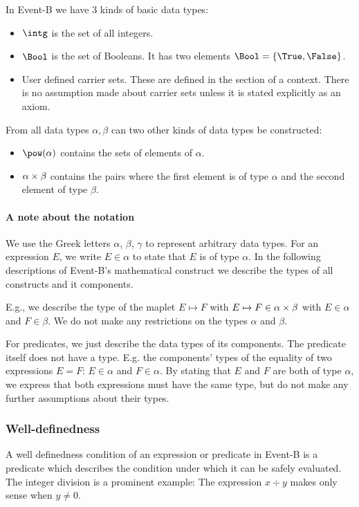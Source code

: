 In Event-B we have 3 kinds of basic data types:
\begin{itemize}
\item $\intg$ is the set of all integers.
\item $\Bool$ is the set of Booleans. 
  It has two elements $\Bool = \{\True,\False\}$.
\item User defined carrier sets. 
  These are defined in the  section of a context.
  There is no assumption made about carrier sets unless it is stated explicitly as
  an axiom.
\end{itemize}
From all data types $\alpha, \beta$ can two other kinds of data types be constructed:
\begin{itemize}
\item $\pow(\alpha)$ contains the sets of elements of $\alpha$.
\item $\alpha\mathbin\times\beta$ contains the pairs where the first element is of type $\alpha$ and the
  second element of type $\beta$.
\end{itemize}
\paragraph{A note about the notation}
We use the Greek letters $\alpha$, $\beta$, $\gamma$ to represent arbitrary data types.
For an expression $E$, we write $E\in\alpha$ to state that $E$ is of type $\alpha$.
In the following descriptions of Event-B's mathematical construct we describe the
  types of all constructs and it components.

E.g., we describe the type of the maplet $E\mapsto F$ with $E\mapsto F\in\alpha\mathbin\times\beta$ with
 $E\in\alpha$ and $F\in\beta$. We do not make any restrictions on the types $\alpha$ and $\beta$.

For predicates, we just describe the data types of its components. 
The predicate itself does not have a type.
E.g. the components' types of the equality of two expressions $E=F$: $E\in\alpha$ and $F\in\alpha$.
By stating that $E$ and $F$ are both of type $\alpha$, we express that both expressions must have the
  same type, but do not make any further assumptions about their types.

\subsubsection{Well-definedness}
\label{well_definedness}

A well definedness condition of an expression or predicate in Event-B is a predicate which describes the condition 
  under which it can be safely evaluated.
The integer division is a prominent example: The expression $x\div y$ makes only sense when $y\neq 0$.

